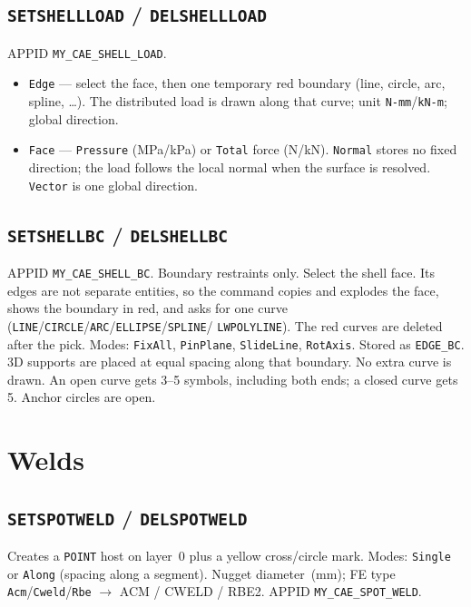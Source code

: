 \documentclass[a4paper]{ltxdoc}
\newcommand{\cadcmd}[1]{\texttt{\textbf{#1}}}
\newcommand{\appid}[1]{\texttt{#1}}
\begin{document}
\subsection{\cadcmd{SETSHELLLOAD} / \cadcmd{DELSHELLLOAD}}
APPID \appid{MY\_CAE\_SHELL\_LOAD}.
\begin{itemize}[nosep]
  \item \texttt{Edge} --- select the face, then one temporary red
        boundary (line, circle, arc, spline, \ldots). The distributed load
        is drawn along that curve; unit \texttt{N-mm}/\texttt{kN-m};
        global direction.
  \item \texttt{Face} --- \texttt{Pressure} (MPa/kPa) or \texttt{Total}
        force (N/kN). \texttt{Normal} stores no fixed direction; the
        load follows the local normal when the surface is resolved.
        \texttt{Vector} is one global direction.
\end{itemize}

\subsection{\cadcmd{SETSHELLBC} / \cadcmd{DELSHELLBC}}
APPID \appid{MY\_CAE\_SHELL\_BC}.  Boundary restraints only.  Select the
shell face.  Its edges are not separate entities, so the command copies
and explodes the face, shows the boundary in red, and asks for one curve
(\texttt{LINE}/\texttt{CIRCLE}/\texttt{ARC}/\texttt{ELLIPSE}/\texttt{SPLINE}/
\texttt{LWPOLYLINE}).  The red curves are deleted after the pick.
Modes: \texttt{FixAll}, \texttt{PinPlane}, \texttt{SlideLine},
\texttt{RotAxis}.  Stored as \texttt{EDGE\_BC}.
3D supports are placed at equal spacing along that boundary.
No extra curve is drawn.  An open curve gets 3--5 symbols, including
both ends; a closed curve gets 5.  Anchor circles are open.

\section{Welds}

\subsection{\cadcmd{SETSPOTWELD} / \cadcmd{DELSPOTWELD}}
Creates a \texttt{POINT} host on layer~0 plus a yellow cross/circle mark.
Modes: \texttt{Single} or \texttt{Along} (spacing along a segment).
Nugget diameter~(mm); FE type \texttt{Acm}/\texttt{Cweld}/\texttt{Rbe}
$\rightarrow$ ACM / CWELD / RBE2.
APPID \appid{MY\_CAE\_SPOT\_WELD}.
\end{document}
